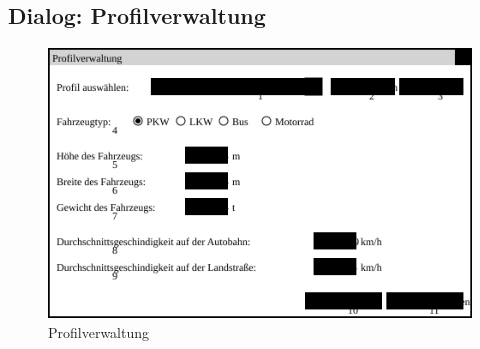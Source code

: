 \documentclass[a4paper, 11pt]{article}
\begin{document}
\subsection{Dialog: Profilverwaltung}
\begin{figure}[H]
\centering
\includegraphics[width=0.9\linewidth]{Profilverwaltung}
\caption{Profilverwaltung}
\label{fig:mockupprofilverwaltung}
\end{figure}
\end{document}
